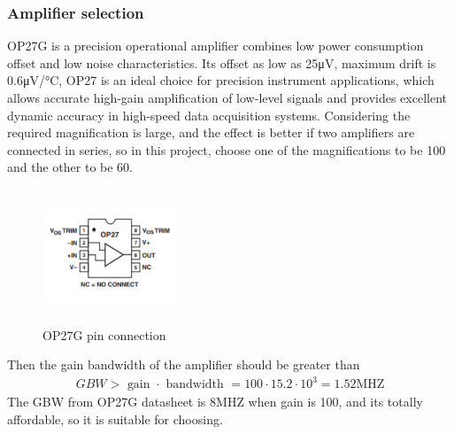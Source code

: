 \subsubsection{Amplifier selection}
OP27G is a precision operational amplifier combines low power consumption offset and low noise characteristics. Its offset as low as 25μV, maximum drift is 0.6μV/°C, OP27 is an ideal choice for precision instrument applications, which allows accurate high-gain amplification of low-level signals and provides excellent dynamic accuracy in high-speed data acquisition systems.
Considering the required magnification is large, and the effect is better if two amplifiers are connected in series, so in this project, choose one of the magnifications to be 100 and the other to be 60.
\begin{figure}[H]
    \centering
    \includegraphics[width=4cm,height=4cm]{figure/OP27Gpin.PNG}
    \caption{OP27G pin connection}
\end{figure}
Then the gain bandwidth of the amplifier should be greater than
 \begin{align}
G B W>\text { gain }\cdot\text { bandwidth }=100\cdot15.2\cdot 10^{3}=1.52 \mathrm{MHZ}
\end{align}
The GBW from OP27G datasheet is 8MHZ when gain is 100, and its totally affordable, so it is suitable for choosing.
